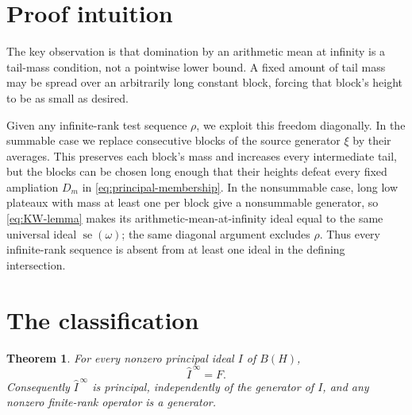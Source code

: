 \documentclass[11pt]{article}
\newtheorem{theorem}{Theorem}
\newcommand{\F}{F}
\newcommand{\se}{\operatorname{se}}
\begin{document}
\section{Proof intuition}

The key observation is that domination by an arithmetic mean at infinity is a
tail-mass condition, not a pointwise lower bound.  A fixed amount of tail mass
may be spread over an arbitrarily long constant block, forcing that block's
height to be as small as desired.

Given any infinite-rank test sequence $\rho$, we exploit this freedom
diagonally.  In the summable case we replace consecutive blocks of the source
generator $\xi$ by their averages.  This preserves each block's mass and
increases every intermediate tail, but the blocks can be chosen long enough
that their heights defeat every fixed ampliation $D_m$ in
\eqref{eq:principal-membership}.  In the nonsummable case, long low plateaux
with mass at least one per block give a nonsummable generator, so
\eqref{eq:KW-lemma} makes its arithmetic-mean-at-infinity ideal equal to the
same universal ideal $\se(\omega)$; the same diagonal argument excludes
$\rho$.  Thus every infinite-rank sequence is absent from at least one ideal
in the defining intersection.

\section{The classification}

\begin{theorem}\label{thm:main}
For every nonzero principal ideal $I$ of $B(H)$,
\[
  \boxed{\widehat I^{\,\infty}=\F.}
\]
Consequently $\widehat I^{\,\infty}$ is principal, independently of the
generator of $I$, and any nonzero finite-rank operator is a generator.
\end{theorem}
\end{document}
